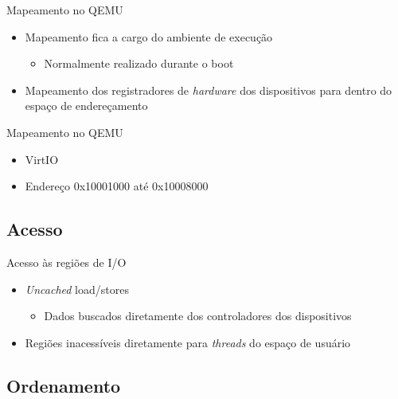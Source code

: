 \documentclass[brazil,nolapesd,aspectratio=169,noartschool]{lapesd-slides}
\begin{document}
	\begin{frame}{Mapeamento no QEMU}
		\begin{itemize}
			\item Mapeamento fica a cargo do ambiente de execução
			\begin{itemize}
				\item Normalmente realizado durante o boot
			\end{itemize}

			\vspace{0.5em}
			\item Mapeamento dos registradores de \textit{hardware} dos dispositivos
				para dentro do espaço de endereçamento
		\end{itemize}
	\end{frame}

	\begin{frame}{Mapeamento no QEMU}
		\begin{itemize}
			\item VirtIO
			\item Endereço 0x10001000 até 0x10008000
		\end{itemize}
	\end{frame}


	\subsection{Acesso}

	\begin{frame}{Acesso às regiões de I/O}
		\begin{itemize}
			\item \textit{Uncached} load/stores
			\begin{itemize}
				\item Dados buscados diretamente dos controladores dos dispositivos
			\end{itemize}

			\vspace{0.5em}
			\item Regiões inacessíveis diretamente para \textit{threads} do espaço de usuário
		\end{itemize}
	\end{frame}


	\subsection{Ordenamento}
\end{document}
